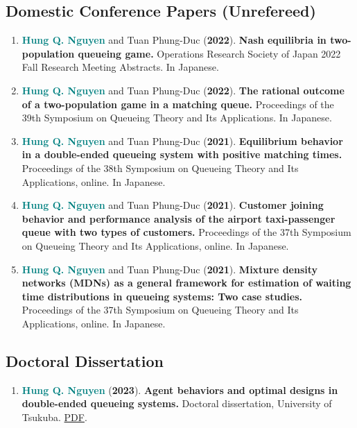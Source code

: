 \documentclass[10pt,a4paper]{article}
\newcommand{\myname}{\textbf{\textcolor{Teal}{Hung Q. Nguyen}}}
\newcommand{\papertitle}[1]{\textbf{#1}}
\newenvironment{publicationlist}{%
  \begin{enumerate}[
    label=\textcolor{Gold}{\bfseries\arabic*.},
    leftmargin=2.1em,
    labelsep=0.55em,
    itemsep=6pt,
    topsep=2pt,
    parsep=0pt,
    partopsep=0pt
  ]\small
}{\end{enumerate}}
\begin{document}
\subsection{Domestic Conference Papers (Unrefereed)}
\begin{publicationlist}
  \item \myname{} and Tuan Phung-Duc (\textbf{2022}). \papertitle{Nash equilibria in two-population queueing game.} Operations Research Society of Japan 2022 Fall Research Meeting Abstracts. In Japanese.

  \item \myname{} and Tuan Phung-Duc (\textbf{2022}). \papertitle{The rational outcome of a two-population game in a matching queue.} Proceedings of the 39th Symposium on Queueing Theory and Its Applications. In Japanese.

  \item \myname{} and Tuan Phung-Duc (\textbf{2021}). \papertitle{Equilibrium behavior in a double-ended queueing system with positive matching times.} Proceedings of the 38th Symposium on Queueing Theory and Its Applications, online. In Japanese.

  \item \myname{} and Tuan Phung-Duc (\textbf{2021}). \papertitle{Customer joining behavior and performance analysis of the airport taxi-passenger queue with two types of customers.} Proceedings of the 37th Symposium on Queueing Theory and Its Applications, online. In Japanese.

  \item \myname{} and Tuan Phung-Duc (\textbf{2021}). \papertitle{Mixture density networks (MDNs) as a general framework for estimation of waiting time distributions in queueing systems: Two case studies.} Proceedings of the 37th Symposium on Queueing Theory and Its Applications, online. In Japanese.
\end{publicationlist}

\subsection{Doctoral Dissertation}
\begin{publicationlist}
  \item \myname{} (\textbf{2023}). \papertitle{Agent behaviors and optimal designs in double-ended queueing systems.} Doctoral dissertation, University of Tsukuba. \href{https://tsukuba.repo.nii.ac.jp/record/2008106/files/DA010775.pdf}{PDF}.
\end{publicationlist}
\end{document}
